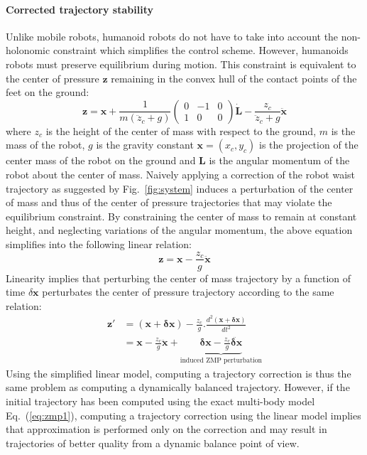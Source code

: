 \paragraph{Corrected trajectory stability}
Unlike mobile robots, humanoid robots do not have to take into account
the non-holonomic constraint which simplifies the control
scheme. However, humanoids robots must preserve equilibrium during
motion. This constraint is equivalent to the center of pressure $\mathbf{z}$
remaining in the convex hull of the contact points of the feet on the ground:
%
%
\begin{equation} \label{eq:zmp1}
  \mathbf{z} = \mathbf{x} + \frac{1}{m(\ddot{z}_c +
    g)}\left(\begin{array}{ccc} 0 &-1 &0\\1 &0 &0\end{array}\right)
    \mathbf{\dot{\textbf{L}}} - \frac{z_c}{\ddot{z}_c + g}
    \ddot{\mathbf{x}}
\end{equation}
where $z_c$ is the height of the center of mass with respect to the
ground, $m$ is the mass of the robot, $g$ is the gravity constant
\mbox{$\mathbf{x}=(x_c,y_c)$} is the projection of the center mass of
the robot on the ground and $\textbf{L}$ is the angular momentum of
the robot about the center of mass.
%
Naively applying a correction of the robot waist trajectory as
suggested by Fig.~\ref{fig:system} induces a perturbation of the
center of mass and thus of the center of pressure trajectories that
may violate the equilibrium constraint.
%
By constraining the center of mass to remain at constant height, and neglecting
variations of the angular momentum, the above equation simplifies into the
following linear relation:
\begin{equation} \label{eq:zmp2}
  \mathbf{z} = \mathbf{x}  - \frac{z_c}{g} \ddot{\mathbf{x}}
\end{equation}
%
Linearity implies that perturbing the center of mass trajectory by a
function of time \mbox{$\delta \mathbf{x}$} perturbates the center of
pressure trajectory according to the same relation:
\begin{equation} \label{eq:zmpperturbation}
\begin{split}
  \mathbf{z'} &= (\mathbf{x} + \mathbf{\delta x}) - \frac{z_c}{g} .
  \frac{d^2 (\mathbf{x} + \mathbf{\delta x})}{d t^2}\\
  &= \mathbf{x} - \frac{z_c}{g} \ddot{\mathbf{x}} +
  \underbrace{\mathbf{\delta x} - \frac{z_c}{g} \ddot{\mathbf{\delta
        x}}}_{\text{induced ZMP perturbation}}
\end{split}
\end{equation}
%
Using the simplified linear model, computing a trajectory correction is thus
the same problem as computing a dynamically balanced trajectory.
%
However, if the initial trajectory has been computed using the exact
multi-body model Eq.~(\ref{eq:zmp1}), computing a trajectory correction
using the linear model implies that approximation is performed only on
the correction and may result in trajectories of better quality from a
dynamic balance point of view.
%
